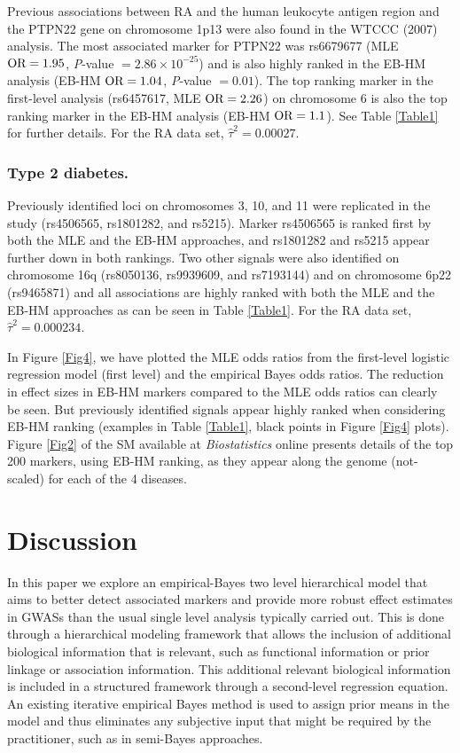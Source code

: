 Previous associations between RA and the human leukocyte
antigen region and the PTPN22 gene on chromosome 1p13
were also found in the WTCCC (2007) analysis.
The most associated marker for PTPN22 was rs6679677
(MLE $\hbox{OR} = 1.95$,
\textit{P}-value $= 2.86 \times 10^{-25}$) and is also
highly ranked in the EB-HM analysis
(EB-HM $\hbox{OR} = 1.04$,
\textit{P}-value $= 0.01$). The top ranking marker in
the first-level analysis (rs6457617, MLE $\hbox{OR} = 2.26$)
on chromosome 6 is also the top ranking marker in the
EB-HM analysis (EB-HM $\hbox{OR} = 1.1$). See
Table \ref{Table1} for further details.
For the RA data set, $\hat{\tau}^2 = 0.00027$.


\subsubsection{Type 2 diabetes.}

Previously identified loci on chromosomes 3, 10, and
11 were replicated in the \citet{Wahba:1990} study
(rs4506565, rs1801282, and rs5215). Marker rs4506565 is
ranked first by both the MLE and the EB-HM approaches,
and rs1801282 and rs5215 appear further down in both
rankings. Two other signals were also identified on
chromosome 16q (rs8050136, rs9939609, and rs7193144) and
on chromosome 6p22 (rs9465871) and all associations are
highly ranked with both the MLE and the EB-HM approaches
as can be seen in Table \ref{Table1}.
For the RA data set, $\hat{\tau}^2 = 0.000234$.

In Figure \ref{Fig4}, we have plotted the MLE odds
ratios from the first-level logistic regression model
(first level) and the empirical Bayes odds ratios. The
reduction in effect sizes in EB-HM markers compared to
the MLE odds ratios can clearly be seen. But previously
identified signals appear highly ranked when considering
EB-HM ranking (examples in Table \ref{Table1}, black points
in Figure \ref{Fig4} plots). Figure \ref{Fig2} of the SM
available at \textit{Biostatistics} online presents details
of the top 200 markers, using EB-HM ranking, as they
appear along the genome (not-scaled) for each of the
4 diseases.


\section{Discussion}
\label{sec4}

In this paper we explore an empirical-Bayes two level
hierarchical model that aims to better detect associated
markers and provide more robust effect estimates in GWASs
than the usual single level analysis typically carried out.
This is done through a hierarchical modeling framework that
allows the inclusion of additional biological information
that is relevant, such as functional information or prior
linkage or association information. This additional relevant
biological information is included in a structured framework
through a second-level regression equation. An existing
iterative empirical Bayes method is used to assign prior
means in the model and thus eliminates any subjective input
that might be required by the practitioner, such as in
semi-Bayes approaches.

